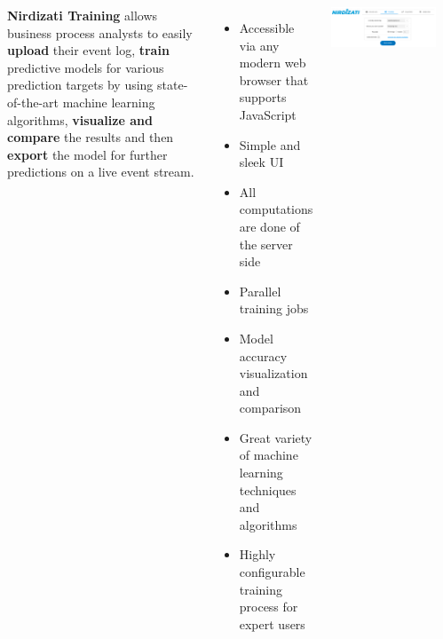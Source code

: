 \documentclass[24pt, a0paper, landscape]{tikzposter}
\begin{document}
\begin{columns}
{\begin{multicols}{2}
        \end{multicols}

        }


        {
        \textbf{Nirdizati Training} allows business process analysts to easily \textbf{upload} their event log, \textbf{train}
        predictive models for various prediction targets by using state-of-the-art machine learning algorithms, \textbf{visualize and compare} the results
        and then \textbf{export} the model for further predictions on a live event stream.
        }

        {
        \begin{itemize}
            \item Accessible via any modern web browser that supports JavaScript
            \item Simple and sleek UI
            \item All computations are done of the server side
            \item Parallel training jobs
            \item Model accuracy visualization and comparison
            \item Great variety of machine learning techniques and algorithms
            \item Highly configurable training process for expert users
        \end{itemize}
        }

        {
        \begin{tikzfigure}
            \includegraphics{figures/training.png}
        \end{tikzfigure}

}
\end{columns}
\end{document}
